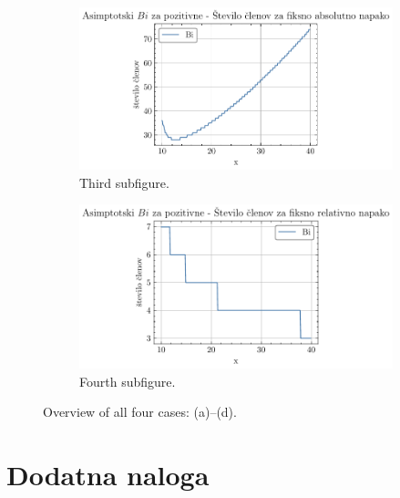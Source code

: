 \documentclass[slovene,11pt,a4paper]{article}
\begin{document}
\begin{figure}[H]
  \begin{subfigure}{0.48\textwidth}
    \centering
    \includegraphics[width=\linewidth]{graphs/pos_abs_err_n_bi.pdf}
    \caption{Third subfigure.}
  \end{subfigure}\hfill
  \begin{subfigure}{0.48\textwidth}
    \centering
    \includegraphics[width=\linewidth]{graphs/pos_rel_err_n_Bi.pdf}
    \caption{Fourth subfigure.}
  \end{subfigure}

  \caption{Overview of all four cases: (a)–(d).}
  \label{fig:fourplots}
\end{figure}


\section{Dodatna naloga}
\end{document}
